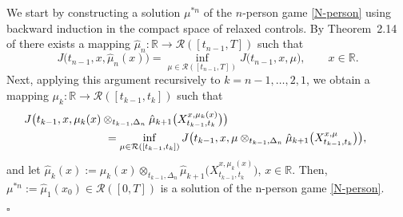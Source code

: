\documentclass[12pt]{article}
\theoremstyle{named}
\numberwithin{equation}{section}
\newenvironment{Proof}{\removelastskip\par\medskip \noindent{\em Proof.} \rm}{\penalty-20\null\hfill$\square$\par\medbreak}
\newcommand{\real}{\mathbb{R}}
\let\oldcitet=\citet
\renewcommand{\cite}[1]{\textcolor[rgb]{0,0,1}{\oldcitet{#1}}}
\renewcommand{\citet}[1]{\textcolor[rgb]{0,0,1}{\oldcitet{#1}}}
\begin{document}
\begin{Proof}
 We start by constructing a solution $\mu^{*n}$ of
 the $n$-person game \eqref{N-person}
 using backward induction
 in the compact space of relaxed controls.
 By Theorem~2.14 of \cite{bahlali2018relaxed}
there exists a mapping $\hat{\mu}_n : \real \to \mathcal{R}([t_{n-1}, T])$ such that
\begin{equation*}
    J\bigl(t_{n-1}, x, \hat{\mu}_n (x) \bigr)
    = \inf\limits_{\mu \in \mathcal{R}([t_{n-1},T])}
    J\bigl(t_{n-1}, x, \mu \bigr),
    \qquad x \in \real.
\end{equation*}
Next, applying this argument recursively to
$k=n-1,\ldots ,2, 1$, we obtain a mapping
 $\mu_k: \real \to \mathcal{R}([t_{k-1}, t_k])$ such that
\begin{eqnarray*}
  \lefteqn{
    \! \! \! \! \! \! \! \! \! \! \! \! \!
    J\big(t_{k-1}, x, \mu_k(x)
    \otimes_{t_{k-1},\Delta_n} \hat{\mu}_{k+1} \big(X^{x,\mu_k(x)}_{t_{k-1}, t_k}\big) \big)
  }
  \\
   & & ~~~~~~~~~~~~~  =\inf\limits_{\mu \in \mathcal{R}([t_{k-1}, t_k])}
        J\big(t_{k-1}, x, \mu
        \otimes_{t_{k-1},\Delta_n} \hat{\mu}_{k+1} \big(X^{x,\mu}_{t_{k-1}, t_k}\big) \big),
\end{eqnarray*}
 and let $\hat{\mu}_k(x) := \mu_k(x)
\otimes_{t_{k-1},\Delta_n} \hat{\mu}_{k+1} \big(X^{x,\mu_k(x)}_{t_{k-1}, t_k}\big)$,
 $x \in \real$.
Then, $\mu^{*n}:=\hat{\mu}_1(x_0) \in \mathcal{R}([0, T])$ is a solution of the n-person game \eqref{N-person}.

  \medskip


\end{Proof}
\end{document}
